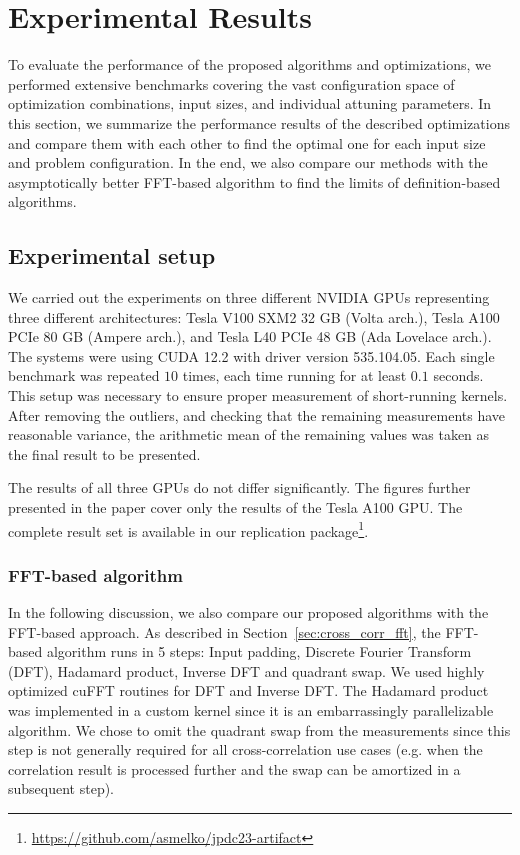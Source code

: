 \section{Experimental Results}\label{sec:crosscorr_experiments}

To evaluate the performance of the proposed algorithms and optimizations, we performed extensive benchmarks covering the vast configuration space of optimization combinations, input sizes, and individual attuning parameters. In this section, we summarize the performance results of the described optimizations and compare them with each other to find the optimal one for each input size and problem configuration. In the end, we also compare our methods with the asymptotically better FFT-based algorithm to find the limits of definition-based algorithms.

\subsection{Experimental setup}

We carried out the experiments on three different NVIDIA GPUs representing three different architectures: Tesla V100 SXM2 32 GB (Volta arch.), Tesla A100 PCIe 80 GB (Ampere arch.), and Tesla L40 PCIe 48 GB (Ada Lovelace arch.). The systems were using CUDA 12.2 with driver version 535.104.05. Each single benchmark was repeated $10$ times, each time running for at least $0.1$ seconds. This setup was necessary to ensure proper measurement of short-running kernels. After removing the outliers, and checking that the remaining measurements have reasonable variance, the arithmetic mean of the remaining values was taken as the final result to be presented.

The results of all three GPUs do not differ significantly. The figures further presented in the paper cover only the results of the Tesla A100 GPU. The complete result set is available in our replication package\footnote{\url{https://github.com/asmelko/jpdc23-artifact}}.

\subsubsection{FFT-based algorithm}

In the following discussion, we also compare our proposed algorithms with the FFT-based approach. As described in Section~\ref{sec:cross_corr_fft}, the FFT-based algorithm runs in 5 steps: Input padding, Discrete Fourier Transform (DFT), Hadamard product, Inverse DFT and quadrant swap. We used highly optimized cuFFT routines for DFT and Inverse DFT. The Hadamard product was implemented in a custom kernel since it is an embarrassingly parallelizable algorithm. We chose to omit the quadrant swap from the measurements since this step is not generally required for all cross-correlation use cases (e.g. when the correlation result is processed further and the swap can be amortized in a subsequent step).


